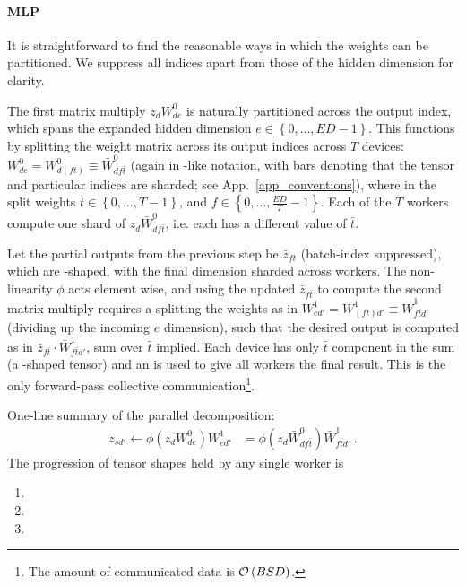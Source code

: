 \documentclass[11pt]{article}
\begin{document}
\paragraph{MLP}
It is straightforward to find the reasonable ways in which the weights can be partitioned. We
suppress all indices apart from those of the hidden dimension for clarity.

The first matrix multiply $ z _{ d }W ^{ 0 } _{ d e } $ is naturally partitioned across the output
index, which spans the expanded hidden dimension $ e\in \left \{ 0, \ldots , ED-1 \right \} $. This
functions by splitting the weight matrix across its output indices across $ T $ devices:  $ W ^{ 0 }
_{ d e }= W ^{ 0 }_{ d (f t) } \equiv  \bar{W} ^{ 0 } _{ d f \bar{t} }$ (again in
-like notation, with bars denoting that the tensor and particular indices are
sharded; see App.~\ref{app_conventions}), where in the split weights $ \bar{t}\in \left \{ 0, \ldots
, T-1 \right \} $, and $ f \in \left \{ 0, \ldots , \frac{ ED }{ T } -1\right \} $. Each of the $ T
$ workers compute one shard of $ z _{ d }\bar{W} ^{ 0 }_{ df \bar{t} } $, i.e. each has a different
value of $ \bar{t} $.


Let the partial outputs from the previous step be $ \bar{z} _{ ft }  $ (batch-index suppressed),
which are -shaped, with the final dimension sharded across workers. The
non-linearity $ \phi $ acts element wise, and using the updated $ \bar{z} _{ f \bar{t} }   $ to
compute the second matrix multiply requires a splitting the weights as in $ W ^{ 1 } _{ e d' }= W ^{
1 }_{ (ft)d' } \equiv \bar{W} ^{ 1 } _{  f \bar{t} d'}$ (dividing up the incoming $ e $ dimension),
such that the desired output is computed as in $  \bar{z} _{ f \bar{t} }\cdot \bar{W} ^{ 1 }_{ f
\bar{t}d' }$, sum over $ \bar{t} $ implied. Each device has only $\bar{t} $ component in the sum (a
-shaped tensor) and an  is used to give all workers the
final result. This  is the only forward-pass collective
communication\footnote{The amount of communicated data is $ \mathcal{O} \left( BSD \right)$.}.

One-line summary of the parallel decomposition:
\begin{align}
 z _{ sd' } \leftarrow   \phi \left (z _{ d }W ^{ 0 }_{ de }\right )W ^{ 1 } _{ ed' } &=\phi \left (z _{ d }\bar{W} ^{ 0 }_{ df \bar{t} }\right )\bar{W} ^{ 1 } _{ f \bar{t}d' } \ .
\end{align}
The progression of tensor shapes held by any single worker is
\begin{enumerate}
    \item {}
    \item {}
    \item {}
\end{enumerate}
\end{document}
